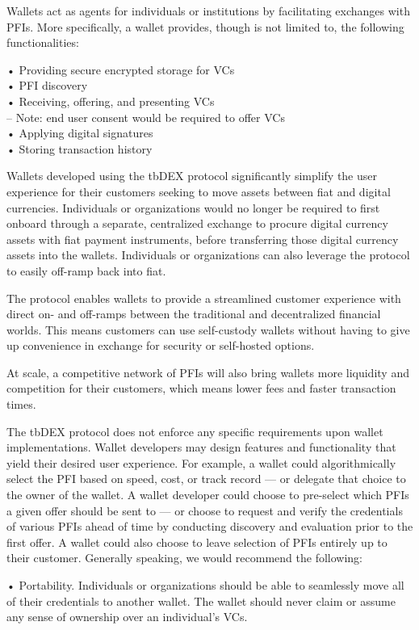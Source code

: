 \documentclass[
]{article}
\begin{document}
Wallets act as agents for individuals or institutions by facilitating
exchanges with PFIs. More specifically, a wallet provides, though is not
limited to, the following functionalities:

• Providing secure encrypted storage for VCs\\
• PFI discovery\\
• Receiving, offering, and presenting VCs\\
-- Note: end user consent would be required to offer VCs\\
• Applying digital signatures\\
• Storing transaction history

Wallets developed using the tbDEX protocol significantly simplify the
user experience for their customers seeking to move assets between fiat
and digital currencies. Individuals or organizations would no longer be
required to first onboard through a separate, centralized exchange to
procure digital currency assets with fiat payment instruments, before
transferring those digital currency assets into the wallets. Individuals
or organizations can also leverage the protocol to easily off-ramp back
into fiat.

The protocol enables wallets to provide a streamlined customer
experience with direct on- and off-ramps between the traditional and
decentralized financial worlds. This means customers can use
self-custody wallets without having to give up convenience in exchange
for security or self-hosted options.

At scale, a competitive network of PFIs will also bring wallets more
liquidity and competition for their customers, which means lower fees
and faster transaction times.

The tbDEX protocol does not enforce any specific requirements upon
wallet implementations. Wallet developers may design features and
functionality that yield their desired user experience. For example, a
wallet could algorithmically select the PFI based on speed, cost, or
track record --- or delegate that choice to the owner of the wallet. A
wallet developer could choose to pre-select which PFIs a given offer
should be sent to --- or choose to request and verify the credentials of
various PFIs ahead of time by conducting discovery and evaluation prior
to the first offer. A wallet could also choose to leave selection of
PFIs entirely up to their customer. Generally speaking, we would
recommend the following:

• Portability. Individuals or organizations should be able to seamlessly
move all of their credentials to another wallet. The wallet should never
claim or assume any sense of ownership over an individual's VCs.
\end{document}
